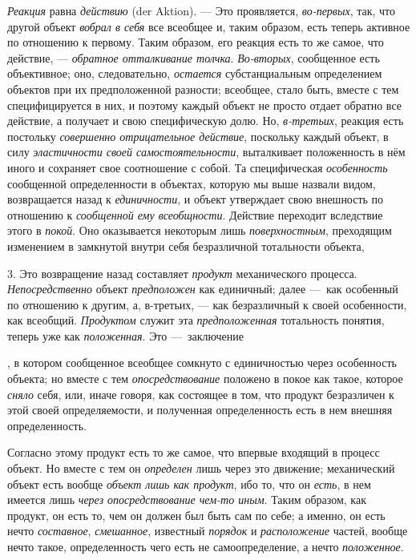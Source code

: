 \documentclass[twoside]{article}
\begin{document}
{{{{{{{\em Реакция} равна
{\em действию} (der Aktion). —
Это проявляется,
{\em во-первых},
так, что другой объект
{\em вобрал в себя} все
всеобщее и, таким образом, есть теперь активное по отношению к первому.
Таким образом, его реакция есть то же самое, что действие, —
{\em обратное отталкивание толчка}.
{\em Во-вторых},
сообщенное есть объективное; оно, следовательно,
{\em остается}
субстанциальным определением объектов при их предположенной
разности; всеобщее, стало быть, вместе с тем специфицируется в них, и
поэтому каждый объект не просто отдает обратно все действие, а получает и
свою специфическую долю. Но,
{\em в-третьих}, реакция
есть постольку {\em совершенно
отрицательное действие}, поскольку каждый объект, в силу
{\em эластичности своей
самостоятельности}, выталкивает положенность в нём иного и
сохраняет свое соотношение с собой. Та специфическая
{\em особенность}
сообщенной определенности в объектах, которую мы выше назвали
видом, возвращается назад к
{\em единичности}, и
объект утверждает свою внешность по отношению к
{\em сообщенной ему всеобщности}.
Действие переходит вследствие этого в
{\em покой}. Оно
оказывается некоторым лишь
{\em поверхностным},
преходящим изменением в замкнутой внутри себя безразличной
тотальности объекта,

3. Это возвращение назад составляет
{\em продукт}
механического процесса.
{\em Непосредственно}
объект {\em предположен}
как единичный; далее  —~как
особенный по отношению к другим, а, в-третьих, — как
безразличный к своей особенности, как всеобщий.
{\em Продуктом} служит
эта {\em предположенная}
тотальность понятия, теперь уже как
{\em положенная}. Это
—~заключение~}\label{bkm:bm70},
в котором сообщенное всеобщее сомкнуто с единичностью через
особенность объекта; но вместе с тем
{\em опосредствование}
положено в покое как такое, которое
{\em сняло} себя, или,
иначе говоря, как состоящее в том, что продукт безразличен к этой своей
определяемости, и полученная определенность есть в нем внешняя
определенность.

Согласно этому продукт есть то же самое, что впервые входящий
в процесс объект. Но вместе с тем он
{\em определен} лишь
через это движение; механический объект есть вообще
{\em объект лишь как продукт},
ибо то, что он
{\em есть}, в нем имеется
лишь {\em через опосредствование
чем-то иным}. Таким образом, как продукт, он есть то,
чем он должен был быть сам по себе; а именно, он есть нечто
{\em составное},
{\em смешанное}, известный
{\em порядок} и
{\em расположение}
частей, вообще нечто такое, определенность чего есть не
самоопределение, а нечто
{\em положенное}.

}}}}}
\end{document}
